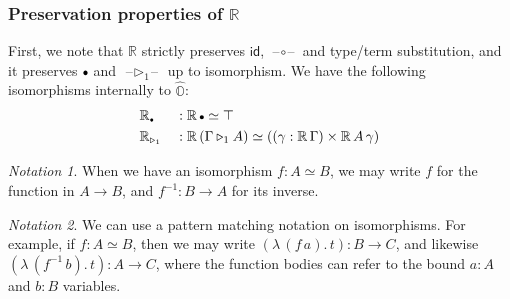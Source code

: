 \documentclass[acmsmall]{acmart}
\newcommand{\msf}[1]{\mathsf{#1}}
\newcommand{\mbb}[1]{\mathbb{#1}}
\newcommand{\ext}{\triangleright}
\newcommand{\mbbo}{\mbb{O}}
\newcommand{\emptycon}{\scaleobj{.75}\bullet}
\newcommand{\id}{\msf{id}}
\newcommand{\blank}{{\mathord{\hspace{1pt}\text{--}\hspace{1pt}}}}
\newcommand{\hato}{\bm\hat{\mbbo}}
\newcommand{\re}{\mbb{R}}
\theoremstyle{remark}
\newtheorem{notation}{Notation}
\begin{document}
\subsubsection{Preservation properties of $\re$}
First, we note that $\re$ strictly preserves $\id$, $\blank\circ\blank$ and
type/term substitution, and it preserves $\emptycon$ and $\blank\ext_1\blank$ up
to isomorphism. We have the following isomorphisms internally to $\hato$:
\begin{alignat*}{3}
  & \re_{\emptycon} &&: \re\,\emptycon \simeq \top \\
  & \re_{\ext_1}   &&: \re\,(\Gamma \ext_1 A) \simeq ((\gamma : \re\,\Gamma) \times \re\,A\,\gamma)
\end{alignat*}

\begin{notation} When we have an isomorphism $f : A \simeq B$, we may write $f$ for the
  function in $A \to B$, and $f^{-1} : B \to A$ for its inverse.
\end{notation}

\begin{notation}
  We can use a pattern matching notation on isomorphisms. For example, if $f : A
  \simeq B$, then we may write $(\lambda\,(f\,a).\,t) : B \to C$, and likewise
  $(\lambda\,(f^{-1}\,b).\,t) : A \to C$, where the function bodies can refer to
  the bound $a : A$ and $b : B$ variables.
\end{notation}
\end{document}
